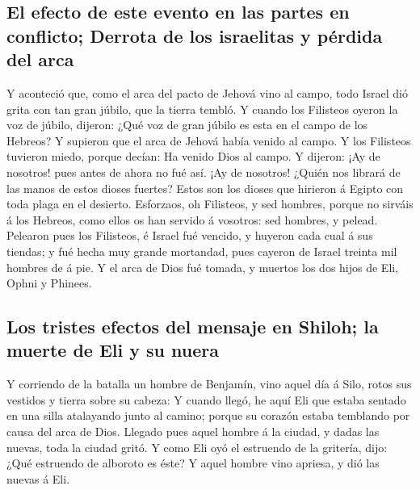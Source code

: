 \hypertarget{el-efecto-de-este-evento-en-las-partes-en-conflicto-derrota-de-los-israelitas-y-puxe9rdida-del-arca}{%
\subsection{El efecto de este evento en las partes en conflicto; Derrota
de los israelitas y pérdida del
arca}\label{el-efecto-de-este-evento-en-las-partes-en-conflicto-derrota-de-los-israelitas-y-puxe9rdida-del-arca}}

 Y aconteció que, como el arca del pacto de Jehová vino al
campo, todo Israel dió grita con tan gran júbilo, que la tierra tembló.
 Y cuando los Filisteos oyeron la voz de júbilo, dijeron:
¿Qué voz de gran júbilo es esta en el campo de los Hebreos? Y supieron
que el arca de Jehová había venido al campo.  Y los
Filisteos tuvieron miedo, porque decían: Ha venido Dios al campo. Y
dijeron: ¡Ay de nosotros! pues antes de ahora no fué así. 
¡Ay de nosotros! ¿Quién nos librará de las manos de estos dioses
fuertes? Estos son los dioses que hirieron á Egipto con toda plaga en el
desierto.  Esforzaos, oh Filisteos, y sed hombres, porque no
sirváis á los Hebreos, como ellos os han servido á vosotros: sed
hombres, y pelead.  Pelearon pues los Filisteos, é Israel
fué vencido, y huyeron cada cual á sus tiendas; y fué hecha muy grande
mortandad, pues cayeron de Israel treinta mil hombres de á pie.
 Y el arca de Dios fué tomada, y muertos los dos hijos de
Eli, Ophni y Phinees.

\hypertarget{los-tristes-efectos-del-mensaje-en-shiloh-la-muerte-de-eli-y-su-nuera}{%
\subsection{Los tristes efectos del mensaje en Shiloh; la muerte de Eli
y su
nuera}\label{los-tristes-efectos-del-mensaje-en-shiloh-la-muerte-de-eli-y-su-nuera}}

 Y corriendo de la batalla un hombre de Benjamín, vino
aquel día á Silo, rotos sus vestidos y tierra sobre su cabeza:
 Y cuando llegó, he aquí Eli que estaba sentado en una
silla atalayando junto al camino; porque su corazón estaba temblando por
causa del arca de Dios. Llegado pues aquel hombre á la ciudad, y dadas
las nuevas, toda la ciudad gritó.  Y como Eli oyó el
estruendo de la gritería, dijo: ¿Qué estruendo de alboroto es éste? Y
aquel hombre vino apriesa, y dió las nuevas á Eli.

